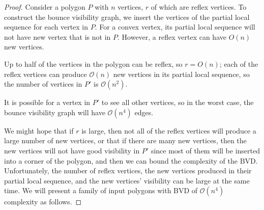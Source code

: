 \documentclass[]{article}  %
\begin{document}
\begin{proof}
Consider a polygon $P$ with $n$ vertices, $r$ of which are reflex vertices. To
construct the bounce visibility graph, we insert the vertices of the partial
local sequence for each vertex in $P$. For a convex vertex, its partial local sequence will not have new vertex that is not
in $P$. However, a reflex vertex can have $O(n)$ new vertices. 

Up to half of the vertices in the polygon can be reflex, so $r = O(n)$; each 
of the reflex vertices can produce $\mathcal{O}(n)$ new vertices in its partial local 
sequence, so the number of vertices in $P'$ is $\mathcal{O}(n^2)$. 

It is possible for a vertex in $P'$ to see all other vertices, so in the worst
case, the bounce visibility graph will have $\mathcal{O}(n^4)$ edges.

We might hope that if $r$ is large, then not all of the reflex vertices will
produce a large number of new vertices, or that if there are many new vertices,
then the new vertices will not have good visibility in $P'$ since most of them
will be inserted into a corner of the polygon, and then we can bound the
complexity of the BVD. Unfortunately, the number of reflex vertices, the new
vertices produced in their partial local sequence, and the new vertices'
visibility can be large at the same time. We will present a family of input
polygons with BVD of $\mathcal{O}(n^4)$ complexity as follows.


\end{proof}
\end{document}
